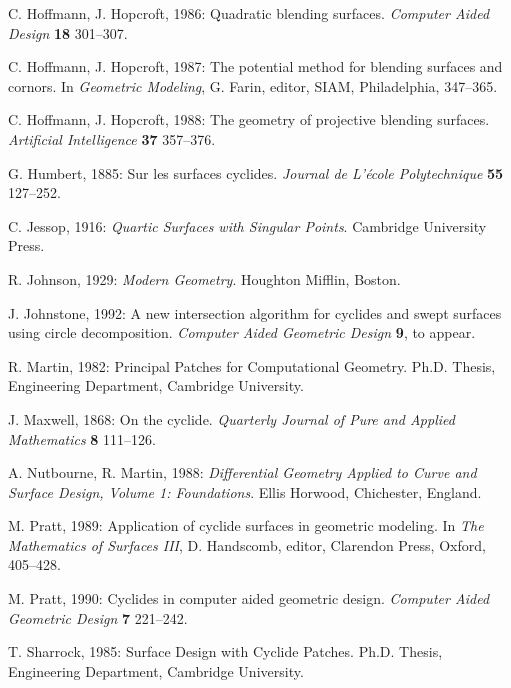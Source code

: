 \begin{thebibliography}{999}
     C. Hoffmann, J. Hopcroft, 1986: 
     Quadratic blending surfaces.
     {\em Computer Aided Design} {\bf 18} 301--307.

     C. Hoffmann, J. Hopcroft, 1987: 
     The potential method for blending surfaces and cornors.
     In {\em Geometric Modeling}, G. Farin, editor, 
     SIAM, Philadelphia, 347--365.

     C. Hoffmann, J. Hopcroft, 1988: 
     The geometry of projective blending surfaces.
     {\em Artificial Intelligence} {\bf 37} 357--376.

     G. Humbert, 1885:
     Sur les surfaces cyclides.
     {\em Journal de L'\'{e}cole Polytechnique} {\bf 55} 127--252.

     C. Jessop, 1916:
     {\em Quartic Surfaces with Singular Points}.
     Cambridge University Press.

     R. Johnson, 1929:
     {\em Modern Geometry}.
     Houghton Mifflin, Boston.

     J. Johnstone, 1992:
     A new intersection algorithm for cyclides and
	swept surfaces using circle decomposition.
     {\em Computer Aided Geometric Design} {\bf 9}, to appear.

     R. Martin, 1982:
     Principal Patches for Computational Geometry.
     Ph.D. Thesis, Engineering Department, Cambridge University.

     J. Maxwell, 1868: 
     On the cyclide.
     {\em Quarterly Journal of Pure and Applied Mathematics} {\bf 8} 111--126.

     A. Nutbourne, R. Martin, 1988: 
     {\em Differential Geometry Applied to Curve and Surface Design, 
          Volume 1: Foundations}.
     Ellis Horwood, Chichester, England.

     M. Pratt, 1989: 
     Application of cyclide surfaces in geometric modeling.
     In {\em The Mathematics of Surfaces III},
     D. Handscomb, editor, Clarendon Press, Oxford, 405--428.

     M. Pratt, 1990: 
     Cyclides in computer aided geometric design.
     {\em Computer Aided Geometric Design} {\bf 7} 221--242.

     T. Sharrock, 1985:
     Surface Design with Cyclide Patches.
     Ph.D. Thesis, Engineering Department, Cambridge University.


\end{thebibliography}
